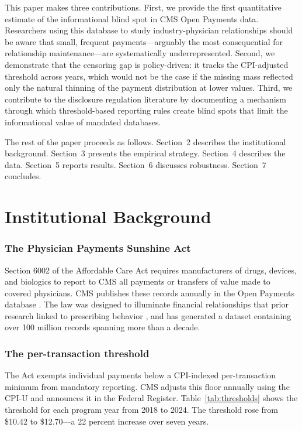 \documentclass[12pt]{article}
\begin{document}
This paper makes three contributions. First, we provide the first quantitative estimate of the informational blind spot in CMS Open Payments data. Researchers using this database to study industry-physician relationships \citep{carey2020drug, dejong2016pharmaceutical, yeh2016association, bishop2018sunshineact} should be aware that small, frequent payments---arguably the most consequential for relationship maintenance---are systematically underrepresented. Second, we demonstrate that the censoring gap is policy-driven: it tracks the CPI-adjusted threshold across years, which would not be the case if the missing mass reflected only the natural thinning of the payment distribution at lower values. Third, we contribute to the disclosure regulation literature \citep{loewenstein2011disclosure, cain2005disclosure, sah2013conflict} by documenting a mechanism through which threshold-based reporting rules create blind spots that limit the informational value of mandated databases.

The rest of the paper proceeds as follows. Section~2 describes the institutional background. Section~3 presents the empirical strategy. Section~4 describes the data. Section~5 reports results. Section~6 discusses robustness. Section~7 concludes.

\section{Institutional Background}

\subsubsection*{The Physician Payments Sunshine Act} Section 6002 of the Affordable Care Act requires manufacturers of drugs, devices, and biologics to report to CMS all payments or transfers of value made to covered physicians. CMS publishes these records annually in the Open Payments database \citep{cmsopenpaymentsdata}. The law was designed to illuminate financial relationships that prior research linked to prescribing behavior \citep{dejong2016pharmaceutical, carey2020drug}, and has generated a dataset containing over 100 million records spanning more than a decade.

\subsubsection*{The per-transaction threshold} The Act exempts individual payments below a CPI-indexed per-transaction minimum from mandatory reporting. CMS adjusts this floor annually using the CPI-U and announces it in the Federal Register. Table~\ref{tab:thresholds} shows the threshold for each program year from 2018 to 2024. The threshold rose from \$10.42 to \$12.70---a 22 percent increase over seven years.
\end{document}

